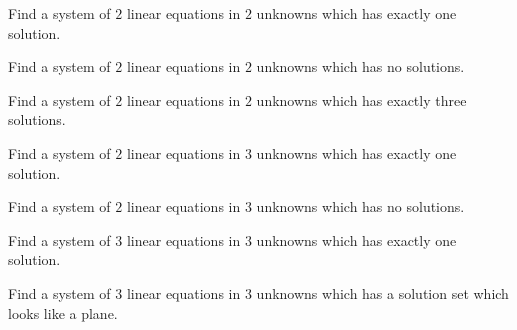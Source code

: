 \documentclass[elementsmain.tex]{subfiles}
\begin{document}
\begin{exercise}
Find a system of $2$ linear equations in $2$ unknowns which has exactly one solution.
\end{exercise}

\begin{exercise}
Find a system of $2$ linear equations in $2$ unknowns which has no solutions.
\end{exercise}

\begin{exercise}
Find a system of $2$ linear equations in $2$ unknowns which has exactly three solutions.
\end{exercise}

\begin{exercise}
Find a system of $2$ linear equations in $3$ unknowns which has exactly one solution.
\end{exercise}

\begin{exercise}
Find a system of $2$ linear equations in $3$ unknowns which has no solutions.
\end{exercise}

\begin{exercise}
Find a system of $3$ linear equations in $3$ unknowns which has exactly one solution.
\end{exercise}

\begin{exercise}
Find a system of $3$ linear equations in $3$ unknowns which has a solution set which looks like a plane.
\end{exercise}

\clearpage
\end{document}
